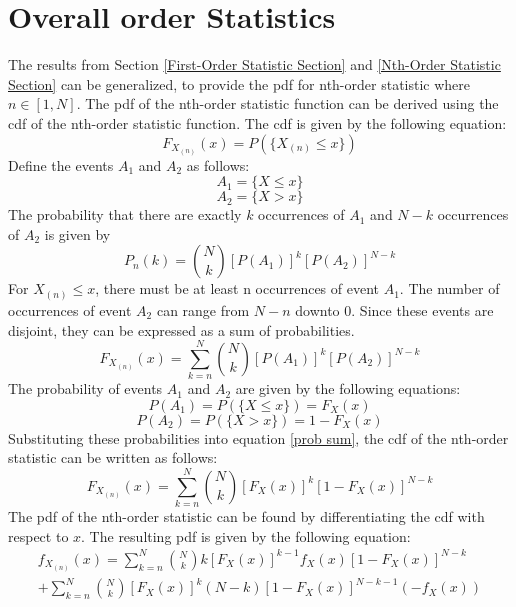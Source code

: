 \documentclass[conference]{IEEEtran}
\begin{document}
\section{Overall order Statistics}
The results from Section \ref{First-Order Statistic Section} and \ref{Nth-Order Statistic Section} can be generalized, to provide the pdf for nth-order statistic where $n\in[1,N]$. The pdf of the nth-order statistic function can be derived using the cdf of the nth-order statistic function. The cdf is given by the following equation:
\begin{equation}
F_{X_{(n)}}(x) = P(\{X_{(n)} \leq x\})
\end{equation}
Define the events $A_1$ and $A_2$ as follows:
\begin{equation}
A_1 = \{X \leq x\}
\end{equation}
\begin{equation}
A_2 = \{X > x\}
\end{equation}
The probability that there are exactly $k$ occurrences of $A_1$ and $N-k$ occurrences of $A_2$ is given by
\begin{equation}
P_n(k) = \binom{N}{k}[P(A_1)]^k[P(A_2)]^{N-k}
\end{equation}
For $X_{(n)} \leq x$, there must be at least n occurrences of event $A_1$. The number of occurrences of event $A_2$ can range from $N-n$ downto $0$. Since these events are disjoint, they can be expressed as a sum of probabilities.
\begin{equation}
\label{prob sum}
F_{X_{(n)}}(x) = \sum_{k=n}^{N}\binom{N}{k}[P(A_1)]^k[P(A_2)]^{N-k}
\end{equation}
The probability of events $A_1$ and $A_2$ are given by the following equations:
\begin{equation}
P(A_1) = P(\{X \leq x\}) = F_X(x)
\end{equation}
\begin{equation}
P(A_2) = P(\{X > x\}) = 1 - F_X(x)
\end{equation}
Substituting these probabilities into equation \eqref{prob sum}, the cdf of the nth-order statistic can be written as follows:
\begin{equation}
F_{X_{(n)}}(x) = \sum_{k=n}^{N}\binom{N}{k}[F_X(x)]^k[1-F_X(x)]^{N-k}
\end{equation}
The pdf of the nth-order statistic can be found by differentiating the cdf with respect to $x$. The resulting pdf is given by the following equation:
\begin{equation}
\begin{gathered}
f_{X_{(n)}}(x) = \sum_{k=n}^{N}\binom{N}{k}k[F_X(x)]^{k-1}f_X(x)[1-F_X(x)]^{N-k}\\
 + \sum_{k=n}^{N}\binom{N}{k}[F_X(x)]^{k}(N-k)[1-F_X(x)]^{N-k-1}(-f_X(x))
\end{gathered}
\end{equation}
\end{document}
